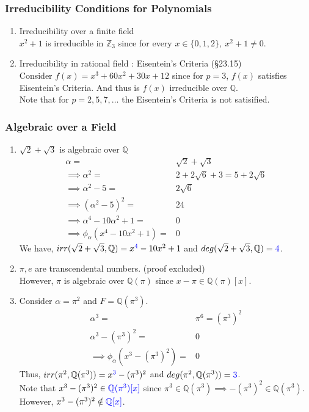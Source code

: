 \subsubsection{Irreducibility Conditions for Polynomials}
\begin{enumerate}
	\item Irreducibility over a finite field\\
		$x^2+1$ is irreducible in $\mathbb{Z}_3$ since for every $x \in \{ 0,1,2 \},\ x^2+1 \ne 0$.
\item Irreducibility in rational field : Eisentein's Criteria (\S23.15) \\
	Consider $f(x) = x^3+60x^2+30x+12$ since for $p=3$, $f(x)$ satisfies Eisentein's Criteria.
		And thus is $f(x)$ irreducible over $\mathbb{Q}$.\\
	Note that for $p = 2,5,7,\dots$ the Eisentein's Criteria is not satisified.
\end{enumerate}
\subsubsection{Algebraic over a Field}
\begin{enumerate}
	\item $\sqrt{2}+\sqrt{3}$ is algebraic over $\mathbb{Q}$ \cite[Exercise 29.2]{fraleigh}
	\begin{align*}
		\alpha = & \sqrt{2} + \sqrt{3} \\
		\implies \alpha^2 = & 2 + 2\sqrt{6} + 3 =  5 + 2\sqrt{6}  \\
		\implies \alpha^2 - 5 =  & 2\sqrt{6} \\
		\implies  (\alpha^2-5)^2 = & 24 \\
		\implies \alpha^4 - 10\alpha^2 + 1 = & 0 \\
		\implies \phi_{\alpha}(x^4 - 10x^2 + 1) = & 0 
	\end{align*}
		We have, $irr(\sqrt{2}+\sqrt{3},\mathbb{Q}) = x^{\textcolor{blue}{4}}-10x^2+1$ and $deg(\sqrt{2}+\sqrt{3},\mathbb{Q}) = \textcolor{blue}{4}$.
	\item $\pi,e$ are transcendental numbers. (proof excluded)\\
		However, $\pi$ is algebraic over $\mathbb{Q}(\pi)$ since $x-\pi \in \mathbb{Q}(\pi)[x]$.
		
	\item Consider $\alpha = \pi^2$ and $F = \mathbb{Q}(\pi^3)$. \cite[Exercise 29.16]{fraleigh}
	\begin{align*}
		\alpha^3 = & \pi^6 = (\pi^3)^2 \\
		\alpha^3-(\pi^3)^2 = & 0 \\
		\implies \phi_\alpha(x^3-(\pi^3)^2) = & 0 
	\end{align*}
	Thus, $irr(\pi^2,\mathbb{Q}(\pi^3)) = x^{\textcolor{blue}{3}}-(\pi^3)^2$ and $deg(\pi^2,\mathbb{Q}(\pi^3)) = \textcolor{blue}{3}$.\\ 
		Note that $x^3-(\pi^3)^2 \in \textcolor{blue}{\mathbb{Q}(\pi^3)[x]}$ since $\pi^3 \in \mathbb{Q}(\pi^3) \implies -(\pi^3)^2 \in \mathbb{Q}(\pi^3)$.
		However, $x^3-(\pi^3)^2 \notin \textcolor{blue}{\mathbb{Q}[x]}$.
\end{enumerate}
